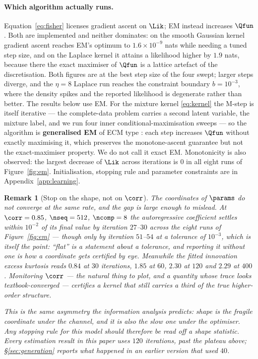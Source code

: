 \documentclass{article}
\newtheorem{remark}{Remark}
\begin{document}
\paragraph{Which algorithm actually runs.} Equation~\eqref{eq:fisher} licenses gradient ascent on
$\Lik$; EM instead increases $\Qfun$. Both are implemented and neither dominates: on the smooth
Gaussian kernel gradient ascent reaches EM's optimum to $1.6\times10^{-9}$ nats while needing a
tuned step size, and on the Laplace kernel it attains a likelihood higher by $1.9$ nats, because
there the exact maximiser of $\Qfun$ is a lattice artefact of the discretisation. Both figures
are at the best step size of the four swept; larger steps diverge, and the $\eta=8$ Laplace run
reaches the constraint boundary $b=10^{-3}$, where the density spikes and the reported
likelihood is degenerate rather than better. The results below use EM.
For the mixture kernel \eqref{eq:kernel} the M-step is itself iterative --- the complete-data
problem carries a second latent variable, the mixture label, and we run four inner
conditional-maximisation sweeps --- so the algorithm is \textbf{generalised EM} of ECM type
\citep{dempster1977,meng1993}: each step increases $\Qfun$ without exactly maximising it, which
preserves the monotone-ascent guarantee \citep{wu1983} but not the exact-maximiser property. We
do not call it exact EM. Monotonicity is also observed: the largest decrease of $\Lik$ across
iterations is $0$ in all eight runs of Figure~\ref{fig:em}. Initialisation, stopping rule and
parameter constraints are in Appendix~\ref{app:learning}.

\begin{remark}[Stop on the shape, not on $\corr$]
\label{rem:stopping}
The coordinates of $\params$ do not converge at the same rate, and the gap is large enough to
mislead. At $\corr=0.85$, $\nseq=512$, $\ncomp=8$ the autoregressive coefficient settles within
$10^{-2}$ of its final value by iteration $27$--$30$ across the eight runs of
Figure~\ref{fig:em} --- though only by iteration $51$--$54$ at a tolerance of $10^{-3}$, which is
itself the point: ``flat'' is a statement about a tolerance, and reporting it without one is how
a coordinate gets certified by eye. Meanwhile the fitted innovation excess kurtosis reads $0.84$ at $30$ iterations,
$1.85$ at $60$, $2.30$ at $120$ and $2.29$ at $400$. Monitoring $\corr$ --- the natural thing to
plot, and a quantity whose trace looks textbook-converged --- certifies a kernel that still
carries a third of the true higher-order structure.

This is the same asymmetry the information analysis predicts: shape is the fragile coordinate
under the channel, and it is also the slow one under the optimiser. Any stopping rule for this
model should therefore be read off a shape statistic. Every estimation result in this paper uses
$120$ iterations, past the plateau above; \S\ref{sec:generation} reports what happened in an
earlier version that used $40$.
\end{remark}
\end{document}
